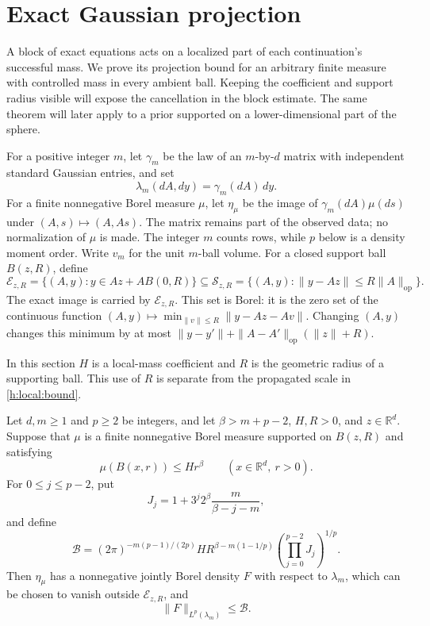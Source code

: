 \section{Exact Gaussian projection}\label{h:projection}

A block of exact equations acts on a localized part of each
continuation's successful mass. We prove its projection bound for an
arbitrary finite measure with controlled mass in every ambient ball.
Keeping the coefficient and support radius visible will expose the
cancellation in the block estimate. The same theorem will later apply
to a prior supported on a lower-dimensional part of the sphere.

For a positive integer \(m\), let \(\gamma_m\) be the law of an
\(m\)-by-\(d\) matrix with independent standard Gaussian entries, and set
\[
 \lambda_m(dA,dy)=\gamma_m(dA)\,dy.
\]
For a finite nonnegative Borel measure \(\mu\), let \(\eta_\mu\) be
the image of \(\gamma_m(dA)\mu(ds)\) under
\((A,s)\mapsto(A,As)\). The matrix remains part of the observed data;
no normalization of \(\mu\) is made. The integer \(m\) counts rows,
while \(p\) below is a density moment order. Write \(v_m\) for the unit
\(m\)-ball volume. For a closed support ball \(B(z,R)\), define
\begin{equation}\label{h:dv:support-sets}
 \mathcal E_{z,R}=\{(A,y):y\in Az+A B(0,R)\}
 \subseteq
 \mathcal S_{z,R}
 =\{(A,y):\|y-Az\|\le R\|A\|_{\mathrm{op}}\}.
\end{equation}
The exact image is carried by \(\mathcal E_{z,R}\). This set is
Borel: it is the zero set of the continuous function
\((A,y)\mapsto\min_{\|v\|\le R}\|y-Az-Av\|\).
Changing \((A,y)\) changes this minimum by at most
\(\|y-y'\|+\|A-A'\|_{\mathrm{op}}(\|z\|+R)\).

In this section \(H\) is a local-mass coefficient and \(R\) is the
geometric radius of a supporting ball. This use of \(R\) is separate
from the propagated scale in \eqref{h:local:bound}.

\begin{theorem}
\label{h:dv:finite-density}
Let \(d,m\ge1\) and \(p\ge2\) be integers, and let
\(\beta>m+p-2\), \(H,R>0\), and \(z\in\mathbb R^d\).
Suppose that \(\mu\) is a finite nonnegative Borel measure supported
on \(B(z,R)\) and satisfying
\begin{equation}\label{h:dv:ambient-bound}
 \mu(B(x,r))\le Hr^\beta
 \qquad(x\in\mathbb R^d,\ r>0).
\end{equation}
For \(0\le j\le p-2\), put
\[
 J_j=1+3^j2^\beta\frac{m}{\beta-j-m},
\]
and define
\begin{equation}\label{h:dv:moment-scale}
 \mathcal B=(2\pi)^{-m(p-1)/(2p)}
 H R^{\beta-m(1-1/p)}
 \left(\prod_{j=0}^{p-2}J_j\right)^{1/p}.
\end{equation}
Then \(\eta_\mu\) has a nonnegative jointly Borel density \(F\)
with respect to \(\lambda_m\), which can be chosen to vanish
outside \(\mathcal E_{z,R}\), and
\begin{equation}\label{h:dv:finite-density-bound}
 \|F\|_{L^p(\lambda_m)}\le\mathcal B.
\end{equation}
\end{theorem}

